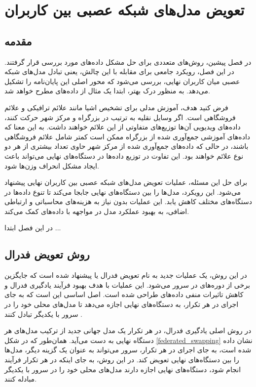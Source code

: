 \chapter{تعویض مدل‌های شبکه عصبی بین کاربران}

\section{مقدمه}
در فصل پیشین، روش‌های متعددی برای حل مشکل داده‌های
مورد بررسی قرار گرفتند. در این فصل، رویکرد جامعی برای مقابله با این چالش، یعنی تبادل مدل‌های شبکه عصبی میان کاربران نهایی، بررسی می‌شود که محور اصلی این پایان‌نامه را تشکیل می‌دهد. به منظور درک بهتر، ابتدا یک مثال از داده‌های
مطرح خواهد شد.

فرض کنید هدف، آموزش مدلی برای تشخیص اشیا مانند علائم ترافیکی و علائم فروشگاهی است. اگر وسایل نقلیه به ترتیب در بزرگراه و مرکز شهر حرکت کنند، داده‌های ویدیویی آن‌ها توزیع‌های متفاوتی از این علائم خواهند داشت. به این معنا که داده‌های آموزشی جمع‌آوری شده از بزرگراه ممکن است کمتر شامل علائم فروشگاهی باشند، در حالی که داده‌های جمع‌آوری شده از مرکز شهر حاوی تعداد بیشتری از هر دو نوع علائم خواهند بود. این تفاوت در توزیع داده‌ها در دستگاه‌های نهایی می‌تواند باعث ایجاد مشکل انحراف وزن‌ها شود.

برای حل این مسئله، عملیات تعویض مدل‌های شبکه عصبی بین کاربران نهایی پیشنهاد می‌شود. این رویکرد، مدل‌ها را بین دستگاه‌های نهایی جابجا می‌کند تا تنوع داده‌ها در دستگاه‌های مختلف کاهش یابد. این عملیات بدون نیاز به هزینه‌های محاسباتی و ارتباطی اضافی، به بهبود عملکرد مدل در مواجهه با داده‌های
کمک می‌کند.

در این فصل ابتدا ...

\section{
	روش تعویض فدرال%
}

در این روش، یک عملیات جدید به نام تعویض فدرال یا
پیشنهاد شده است که جایگزین برخی از دوره‌های
در سرور می‌شود. این عملیات با هدف بهبود فرآیند یادگیری فدرال و کاهش تاثیرات منفی داده‌های
طراحی شده است. اصل اساسی
این است که به جای اجرای
در هر تکرار، به دستگاه‌های نهایی اجازه می‌دهد تا مدل‌های محلی خود را در سرور با یکدیگر تبادل کنند
\cite{chiu2020semisupervised}.


در روش اصلی یادگیری فدرال، در هر تکرار یک مدل جهانی جدید از ترکیب مدل‌های هر دستگاه نهایی به دست می‌آید. همان‌طور که در شکل
\ref{federated_swapping}
نشان داده شده است، به جای اجرای
در هر تکرار، سرور می‌تواند به عنوان یک گزینه دیگر، مدل‌ها را بین دستگاه‌های نهایی تعویض کند. در این روش، به جای اینکه در هر تکرار فرآیند
انجام شود، دستگاه‌های نهایی اجازه دارند مدل‌های محلی خود را در سرور با یکدیگر مبادله کنند.


